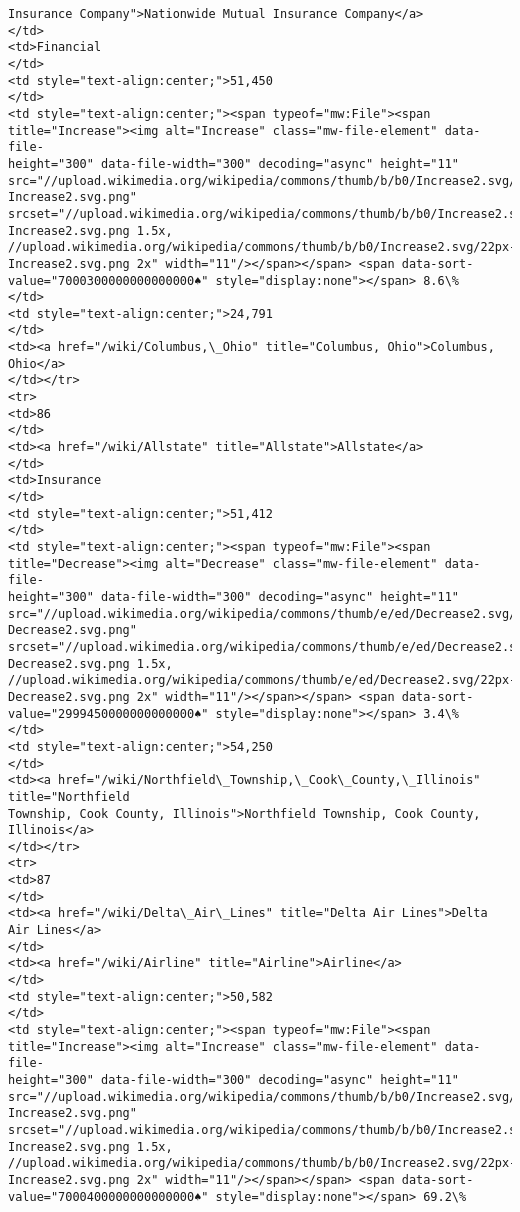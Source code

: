 \documentclass[11pt]{article}
\begin{document}
\begin{Verbatim}[commandchars=\\\{\}]
Insurance Company">Nationwide Mutual Insurance Company</a>
</td>
<td>Financial
</td>
<td style="text-align:center;">51,450
</td>
<td style="text-align:center;"><span typeof="mw:File"><span
title="Increase"><img alt="Increase" class="mw-file-element" data-file-
height="300" data-file-width="300" decoding="async" height="11"
src="//upload.wikimedia.org/wikipedia/commons/thumb/b/b0/Increase2.svg/11px-
Increase2.svg.png"
srcset="//upload.wikimedia.org/wikipedia/commons/thumb/b/b0/Increase2.svg/17px-
Increase2.svg.png 1.5x,
//upload.wikimedia.org/wikipedia/commons/thumb/b/b0/Increase2.svg/22px-
Increase2.svg.png 2x" width="11"/></span></span> <span data-sort-
value="7000300000000000000♠" style="display:none"></span> 8.6\%
</td>
<td style="text-align:center;">24,791
</td>
<td><a href="/wiki/Columbus,\_Ohio" title="Columbus, Ohio">Columbus, Ohio</a>
</td></tr>
<tr>
<td>86
</td>
<td><a href="/wiki/Allstate" title="Allstate">Allstate</a>
</td>
<td>Insurance
</td>
<td style="text-align:center;">51,412
</td>
<td style="text-align:center;"><span typeof="mw:File"><span
title="Decrease"><img alt="Decrease" class="mw-file-element" data-file-
height="300" data-file-width="300" decoding="async" height="11"
src="//upload.wikimedia.org/wikipedia/commons/thumb/e/ed/Decrease2.svg/11px-
Decrease2.svg.png"
srcset="//upload.wikimedia.org/wikipedia/commons/thumb/e/ed/Decrease2.svg/17px-
Decrease2.svg.png 1.5x,
//upload.wikimedia.org/wikipedia/commons/thumb/e/ed/Decrease2.svg/22px-
Decrease2.svg.png 2x" width="11"/></span></span> <span data-sort-
value="2999450000000000000♠" style="display:none"></span> 3.4\%
</td>
<td style="text-align:center;">54,250
</td>
<td><a href="/wiki/Northfield\_Township,\_Cook\_County,\_Illinois" title="Northfield
Township, Cook County, Illinois">Northfield Township, Cook County, Illinois</a>
</td></tr>
<tr>
<td>87
</td>
<td><a href="/wiki/Delta\_Air\_Lines" title="Delta Air Lines">Delta Air Lines</a>
</td>
<td><a href="/wiki/Airline" title="Airline">Airline</a>
</td>
<td style="text-align:center;">50,582
</td>
<td style="text-align:center;"><span typeof="mw:File"><span
title="Increase"><img alt="Increase" class="mw-file-element" data-file-
height="300" data-file-width="300" decoding="async" height="11"
src="//upload.wikimedia.org/wikipedia/commons/thumb/b/b0/Increase2.svg/11px-
Increase2.svg.png"
srcset="//upload.wikimedia.org/wikipedia/commons/thumb/b/b0/Increase2.svg/17px-
Increase2.svg.png 1.5x,
//upload.wikimedia.org/wikipedia/commons/thumb/b/b0/Increase2.svg/22px-
Increase2.svg.png 2x" width="11"/></span></span> <span data-sort-
value="7000400000000000000♠" style="display:none"></span> 69.2\%

\end{Verbatim}
\end{document}
